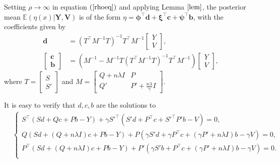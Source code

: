 Setting $\rho \rightarrow \infty$ in equation $(\ref{rhoeq})$ and applying Lemma $\ref{lem}$, the posterior mean $\mathbb{E}(\eta(x)|\mathbf{Y},\mathbf{V})$ is of the form $\eta = \mathbf{\phi}^\top \mathbf{d}+\mathbf{\xi}^\top \mathbf{c}+\mathbf{\psi}^\top \mathbf{b}$, with the coefficients given by
\begin{align*}
\mathbf{d}&=(T^\top M^{-1}T)^{-1}T^\top M^{-1}\begin{bmatrix}Y\\V \end{bmatrix},\\
\begin{bmatrix}\mathbf{c}\\\mathbf{b}\end{bmatrix} &=
(M^{-1}-M^{-1}T(T^\top M^{-1} T)^{-1}T^\top M^{-1})\begin{bmatrix}Y\\V \end{bmatrix},
\end{align*} where $T=\begin{bmatrix} S\\S' \end{bmatrix}$ and $M=\begin{bmatrix}
Q+n\lambda I& P\\
Q'& P'+\frac{n\lambda}{\gamma}I
\end{bmatrix}$.


It is easy to verify that $d,c,b$ are the solutions to
\begin{align*}
&\begin{cases}
S^\top (Sd +Qc+Pb-Y) +\gamma S'^\top( S'd+ P^\top c+S'^\top P'b-V)=0, \\
Q(Sd+(Q+n\lambda I)c+Pb-Y) + P ( \gamma S'd +  \gamma P^\top c+ (\gamma P'+n\lambda I) b- \gamma V)=0, \\
P^\top (Sd+(Q+n\lambda I) c +Pb-Y)+P'(\gamma S'b+P^\top c +(\gamma P'+n\lambda I)b- \gamma V)=0. \\
\end{cases}
\end{align*}


